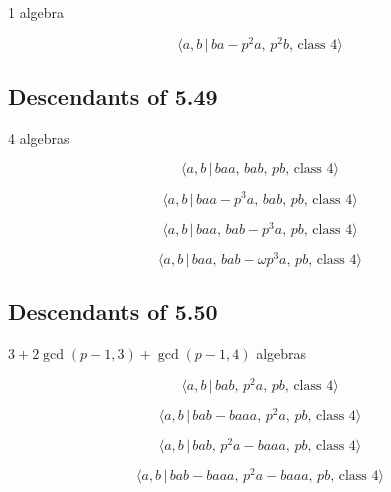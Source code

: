 \documentclass[10pt]{article}
\begin{document}
1 algebra

\begin{equation}
\langle a,b\,|\,ba-p^2a,\,p^2b,\,\text{class }4\rangle  \tag{6.430}
\end{equation}

\subsection{Descendants of 5.49}

4 algebras

\begin{equation}
\langle a,b\,|\,baa,\,bab,\,pb,\,\text{class }4\rangle  \tag{6.431}
\end{equation}

\begin{equation}
\langle a,b\,|\,baa-p^3a,\,bab,\,pb,\,\text{class }4\rangle  \tag{6.432}
\end{equation}

\begin{equation}
\langle a,b\,|\,baa,\,bab-p^3a,\,pb,\,\text{class }4\rangle  \tag{6.433}
\end{equation}

\begin{equation}
\langle a,b\,|\,baa,\,bab-\omega p^3a,\,pb,\,\text{class }4\rangle 
\tag{6.434}
\end{equation}

\subsection{Descendants of 5.50}

$3+2\gcd (p-1,3)+\gcd (p-1,4)$ algebras

\begin{equation}
\langle a,b\,|\,bab,\,p^2a,\,pb,\,\text{class }4\rangle  \tag{6.435}
\end{equation}

\begin{equation}
\langle a,b\,|\,bab-baaa,\,p^2a,\,pb,\,\text{class }4\rangle  \tag{6.436}
\end{equation}

\begin{equation}
\langle a,b\,|\,bab,\,p^2a-baaa,\,pb,\,\text{class }4\rangle  \tag{6.437}
\end{equation}

\begin{equation}
\langle a,b\,|\,bab-baaa,\,p^2a-baaa,\,pb,\,\text{class }4\rangle 
\tag{6.438}
\end{equation}
\end{document}
